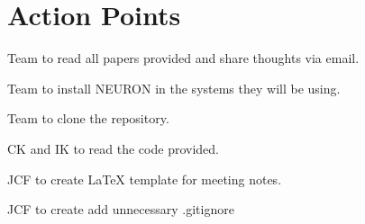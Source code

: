 \documentclass{article}
\begin{document}
\section*{Action Points}
\begin{compactenum}
\item Team to read all papers provided and share thoughts via email.
\item Team to install NEURON in the systems they will be using.
\item Team to clone the repository.
\item CK and IK to read the code provided.
\item JCF to create LaTeX template for meeting notes.
\item JCF to create add unnecessary .gitignore 
\end{compactenum}
\end{document}
